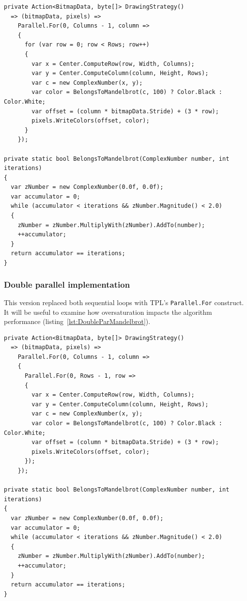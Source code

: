 \begin{lstlisting}[style=sharpcstyle, caption={Parallel \texttt{Mandelbrot} algorithm}, label={lst:ParMandelbrot},
numbers=none, xleftmargin=0pt,framexleftmargin=0pt,framexrightmargin=0pt,framexbottommargin=0pt]
private Action<BitmapData, byte[]> DrawingStrategy()
  => (bitmapData, pixels) =>
    Parallel.For(0, Columns - 1, column =>
    {
      for (var row = 0; row < Rows; row++)
      {
        var x = Center.ComputeRow(row, Width, Columns);
        var y = Center.ComputeColumn(column, Height, Rows);
        var c = new ComplexNumber(x, y);
        var color = BelongsToMandelbrot(c, 100) ? Color.Black : Color.White;
        var offset = (column * bitmapData.Stride) + (3 * row);
        pixels.WriteColors(offset, color);
      }
    });

private static bool BelongsToMandelbrot(ComplexNumber number, int iterations)
{
  var zNumber = new ComplexNumber(0.0f, 0.0f);
  var accumulator = 0;
  while (accumulator < iterations && zNumber.Magnitude() < 2.0)
  {
    zNumber = zNumber.MultiplyWith(zNumber).AddTo(number);
    ++accumulator;
  }
  return accumulator == iterations;
}
\end{lstlisting}

\subsubsection{Double parallel implementation}
This version replaced both sequential loops with TPL's \texttt{Parallel.For} construct. It will be useful to examine how oversaturation impacts the algorithm performance (listing~\ref{lst:DoubleParMandelbrot}).

\begin{lstlisting}[style=sharpcstyle, caption={Double parallel \texttt{Mandelbrot} algorithm}, label={lst:DoubleParMandelbrot},
numbers=none, xleftmargin=0pt,framexleftmargin=0pt,framexrightmargin=0pt,framexbottommargin=0pt]
private Action<BitmapData, byte[]> DrawingStrategy()
  => (bitmapData, pixels) =>
    Parallel.For(0, Columns - 1, column =>
    {
      Parallel.For(0, Rows - 1, row =>
      {
        var x = Center.ComputeRow(row, Width, Columns);
        var y = Center.ComputeColumn(column, Height, Rows);
        var c = new ComplexNumber(x, y);
        var color = BelongsToMandelbrot(c, 100) ? Color.Black : Color.White;
        var offset = (column * bitmapData.Stride) + (3 * row);
        pixels.WriteColors(offset, color);
      });
    });

private static bool BelongsToMandelbrot(ComplexNumber number, int iterations)
{
  var zNumber = new ComplexNumber(0.0f, 0.0f);
  var accumulator = 0;
  while (accumulator < iterations && zNumber.Magnitude() < 2.0)
  {
    zNumber = zNumber.MultiplyWith(zNumber).AddTo(number);
    ++accumulator;
  }
  return accumulator == iterations;
}
\end{lstlisting}

